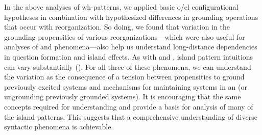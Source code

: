 In the above analyses of wh-patterns, we applied basic o/el configurational hypotheses in combination with hypothesized differences in grounding operations that occur with reorganization. So doing, we found that variation in the grounding propensities of various reorganizations—which were also useful for analyses of  and  phenomena—also help us understand long-distance dependencies in  question formation and island effects. As with  and , island pattern  intuitions can vary substantially (\citealt{Kluender1998,SprouseHornstein2013,SprouseEtAl2012}). For all three of these phenomena, we can understand the variation as the consequence of a tension between propensities to ground previously excited systems and mechanisms for maintaining systems in an  (or ungrounding previously grounded systems). It is encouraging that the same concepts required for understanding  and  provide a basis for analysis of many of the island patterns. This suggests that a comprehensive understanding of diverse syntactic phenomena is achievable.

